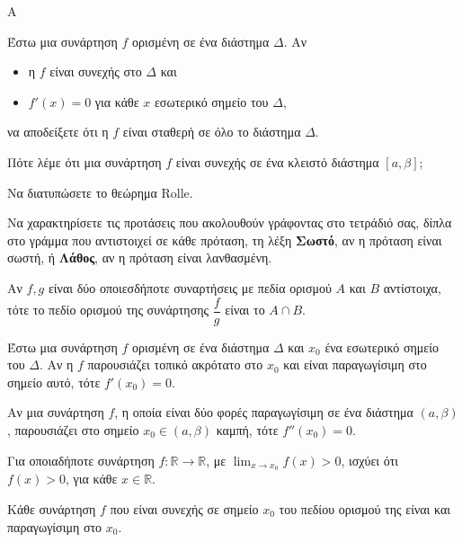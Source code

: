 \begin{thema}{Α}
\begin{erwthma}
    \item Έστω μια συνάρτηση $f$ ορισμένη σε ένα διάστημα $\Delta$. Αν
    \begin{itemize}
        \item η $f$ είναι συνεχής στο $\Delta$ και
        \item $f'(x) = 0$ για κάθε $x$ εσωτερικό σημείο του $\Delta$,
    \end{itemize}
    να αποδείξετε ότι η $f$ είναι σταθερή σε όλο το διάστημα $\Delta$. 

    \item Πότε λέμε ότι μια συνάρτηση $f$ είναι συνεχής σε ένα κλειστό διάστημα $[a, \beta]$; 

    \item Να διατυπώσετε το θεώρημα Rolle. 

    \item Να χαρακτηρίσετε τις προτάσεις που ακολουθούν γράφοντας στο τετράδιό σας, δίπλα στο γράμμα που αντιστοιχεί σε κάθε πρόταση, τη λέξη \textbf{Σωστό}, αν η πρόταση είναι σωστή, ή \textbf{Λάθος}, αν η πρόταση είναι λανθασμένη.
    \begin{alist}
        \item Αν $f, g$ είναι δύο οποιεσδήποτε συναρτήσεις με πεδία ορισμού $A$ και $B$ αντίστοιχα, τότε το πεδίο ορισμού της συνάρτησης $\dfrac{f}{g}$ είναι το $A \cap B$.

        \item Έστω μια συνάρτηση $f$ ορισμένη σε ένα διάστημα $\Delta$ και $x_0$ ένα εσωτερικό σημείο του $\Delta$. Αν η $f$ παρουσιάζει τοπικό ακρότατο στο $x_0$ και είναι παραγωγίσιμη στο σημείο αυτό, τότε $f'(x_0) = 0$.

        \item Αν μια συνάρτηση $f$, η οποία είναι δύο φορές παραγωγίσιμη σε ένα διάστημα $(a, \beta)$, παρουσιάζει στο σημείο $x_0 \in (a, \beta)$ καμπή, τότε $f''(x_0) = 0$.

        \item Για οποιαδήποτε συνάρτηση $f: \mathbb{R} \to \mathbb{R}$, με $\displaystyle\lim_{x \to x_0} f(x) > 0$, ισχύει ότι $f(x) > 0$, για κάθε $x \in \mathbb{R}$.

        \item Κάθε συνάρτηση $f$ που είναι συνεχής σε σημείο $x_0$ του πεδίου ορισμού της είναι και παραγωγίσιμη στο $x_0$.
    \end{alist}
\end{erwthma}
\end{thema}

